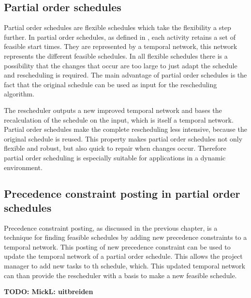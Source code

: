 \documentclass{article}
\newcommand{\TODO}[1]{{\color{red}\textbf{TODO: #1}}}
\begin{document}
\subsection{Partial order schedules}
Partial order schedules are flexible schedules which take the flexibility a step further.
In partial order schedules, as defined in \citet{policella07}, each activity retains a set of feasible start times.
They are represented by a temporal network, this network represents the different feasible schedules.
In all flexible schedules there is a possibility that the changes that occur are too large to just adapt the schedule and rescheduling is required.
The main advantage of partial order schedules is the fact that the original schedule can be used as input for the rescheduling algorithm.

The rescheduler outputs a new improved temporal network and bases the recalculation of the schedule on the input, which is itself a temporal network.
Partial order schedules make the complete rescheduling less intensive, because the original schedule is reused.
This property makes partial order schedules not only flexible and robust, but also quick to repair when changes occur.
Therefore partial order scheduling is especially suitable for applications in a dynamic environment.

\subsection{Precedence constraint posting in partial order schedules}
Precedence constraint posting, as discussed in the previous chapter, is a technique for finding feasible schedules by adding new precedence constraints to a temporal network.
This posting of new precedence constraint can be used to update the temporal network of a partial order schedule.
This allows the project manager to add new tasks to th schedule, which.
This updated temporal network can than provide the rescheduler with a basis to make a new feasible schedule.

\TODO{MickL: uitbreiden}
\end{document}
